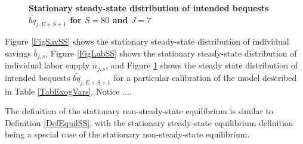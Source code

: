 \documentclass[letterpaper,12pt]{article}
\theoremstyle{definition}
\begin{document}
\begin{spacing}{1.5}
    \begin{figure}[htb]\centering \captionsetup{width=4.0in}
      \caption{\label{FigBeqSS}\textbf{Stationary steady-state distribution of intended bequests $\bar{bq}_{j,E+S+1}$ for $S=80$ and $J=7$}}
    \end{figure}

    Figure \ref{FigSavSS} shows the stationary steady-state distribution of individual savings $\bar{b}_{j,s}$, Figure \ref{FigLabSS} shows the stationary steady-state distribution of individual labor supply $\bar{n}_{j,s}$, and Figure \ref{FigBeqSS} shows the steady state distribution of intended bequests $\bar{bq}_{j,E+S+1}$ for a particular calibration of the model described in Table \ref{TabExogVars}. Notice .... %

    The definition of the stationary non-steady-state equilibrium is similar to Definition \ref{DefEquilSS}, with the stationary steady-state equilibrium definition being a special case of the stationary non-steady-state equilibrium.

    \vspace{7mm}
    \end{spacing}
\end{document}
